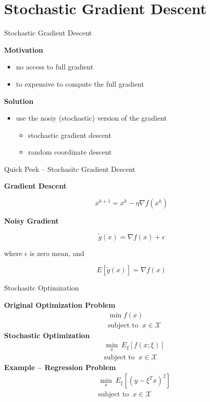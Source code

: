 \documentclass[aspectratio=169,xcolor=dvipsnames]{beamer}
\begin{document}
\section{Stochastic Gradient Descent}

\begin{frame}{Stochastic Gradient Descent}

\textbf{Motivation}

\begin{itemize}
	\item no access to full gradient
	\item to expensive to compute the full gradient
\end{itemize}

\textbf{Solution}

\begin{itemize}
	\item use the nosiy (stochastic) version of the gradient
	\begin{itemize}
		\item stochastic gradient descent
		\item random coordinate descent
	\end{itemize}
\end{itemize}
	
\end{frame}


\begin{frame}{Quick Peek -- Stochasitc Gradient Descent}

\textbf{Gradient Descent}

$$x^{k+1} = x^k - \eta \nabla f(x^k)$$

\textbf{Noisy Gradient}

$$\tilde g(x) = \nabla f(x) + \epsilon$$

where $\epsilon$ is zero mean, and 

$$E[\tilde g(x)] = \nabla f(x)$$
	
\end{frame}


\begin{frame}{Stochasitc Optimization}

\textbf{Original Optimization Problem}
\begin{align*}
	&\min f(x)\\
	&\text{subject to } \ x \in \mathcal X
\end{align*}
\textbf{Stochastic Optimization}
\begin{align*}
	&\min_x\  E_\xi [f(x; \xi )]\\
	&\text{subject to } \ x \in \mathcal X
\end{align*}
\textbf{Example -- Regression Problem}
\begin{align*}
	&\min_x \ E_\xi[(y - \xi^T x)^2]\\
	&\text{subject to } \ x \in \mathcal X
\end{align*}
\end{frame}
\end{document}
